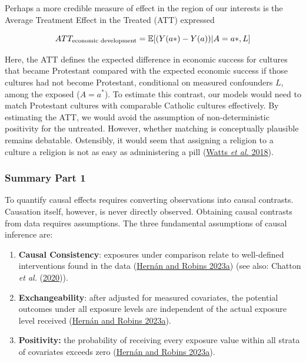 \documentclass[
  singlecolumn]{article}
\begin{document}
Perhaps a more credible measure of effect in the region of our interests
is the Average Treatment Effect in the Treated (ATT) expressed

\[ATT_{\textnormal{economic~development}} = \mathbb{E}[(Y(a*)- Y(a))|A = a*,L]\]

Here, the ATT defines the expected difference in economic success for
cultures that became Protestant compared with the expected economic
success if those cultures had not become Protestant, conditional on
measured confounders \(L\), among the exposed (\(A = a^*\)). To estimate
this contrast, our models would need to match Protestant cultures with
comparable Catholic cultures effectively. By estimating the ATT, we
would avoid the assumption of non-deterministic positivity for the
untreated. However, whether matching is conceptually plausible remains
debatable. Ostensibly, it would seem that assigning a religion to a
culture a religion is not as easy as administering a pill
(\protect\hyperlink{ref-watts2018}{Watts \emph{et al.} 2018}).

\hypertarget{summary-part-1}{%
\subsubsection{Summary Part 1}\label{summary-part-1}}

To quantify causal effects requires converting observations into causal
contrasts. Causation itself, however, is never directly observed.
Obtaining causal contrasts from data requires assumptions. The three
fundamental assumptions of causal inference are:

\begin{enumerate}
\def\labelenumi{\arabic{enumi}.}
\item
  \textbf{Causal Consistency}: exposures under comparison relate to
  well-defined interventions found in the data
  (\protect\hyperlink{ref-hernuxe1n2023}{Hernán and Robins 2023a}) (see
  also: Chatton \emph{et al.}
  (\protect\hyperlink{ref-chatton2020}{2020})).
\item
  \textbf{Exchangeability}: after adjusted for measured covariates, the
  potential outcomes under all exposure levels are independent of the
  actual exposure level received
  (\protect\hyperlink{ref-hernuxe1n2023}{Hernán and Robins 2023a}).
\item
  \textbf{Positivity:} the probability of receiving every exposure value
  within all strata of covariates exceeds zero
  (\protect\hyperlink{ref-hernuxe1n2023}{Hernán and Robins 2023a}).
\end{enumerate}
\end{document}
